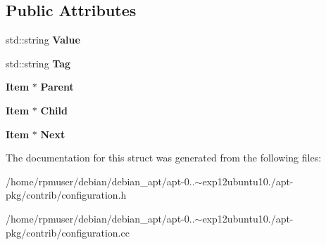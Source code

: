 \subsection*{\-Public \-Attributes}
\begin{DoxyCompactItemize}
\item 
std\-::string {\bfseries \-Value}\label{structConfiguration_1_1Item_a7ae4d22d972474ac0237b1f16e4bb9c4}

\item 
std\-::string {\bfseries \-Tag}\label{structConfiguration_1_1Item_af7ac36bec5ac2e7e5e9de05230d84009}

\item 
{\bf \-Item} $\ast$ {\bfseries \-Parent}\label{structConfiguration_1_1Item_a4b8006db4da8f6622c468f9c18dfcea6}

\item 
{\bf \-Item} $\ast$ {\bfseries \-Child}\label{structConfiguration_1_1Item_abd5fe1145fe3b512f08fee943e5f0d2e}

\item 
{\bf \-Item} $\ast$ {\bfseries \-Next}\label{structConfiguration_1_1Item_a2c2aff0fdea60c3b0247ffdb9c92a7d3}

\end{DoxyCompactItemize}


\-The documentation for this struct was generated from the following files\-:\begin{DoxyCompactItemize}
\item 
/home/rpmuser/debian/debian\-\_\-apt/apt-\/0..$\sim$exp12ubuntu10./apt-\/pkg/contrib/configuration.\-h\item 
/home/rpmuser/debian/debian\-\_\-apt/apt-\/0..$\sim$exp12ubuntu10./apt-\/pkg/contrib/configuration.\-cc\end{DoxyCompactItemize}
